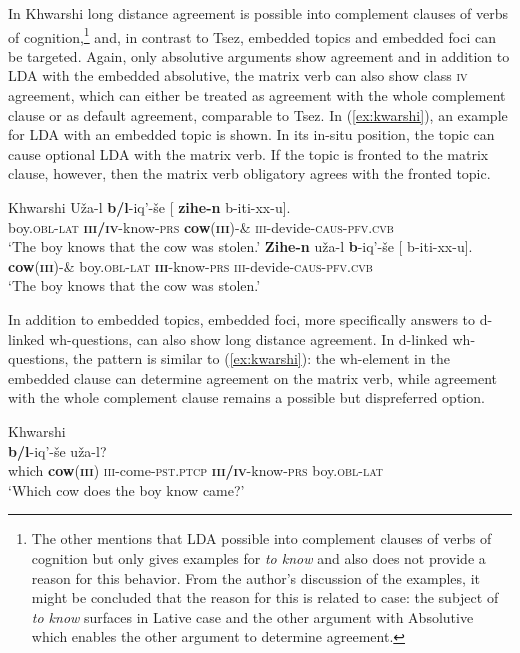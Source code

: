 \documentclass[output=paper
,modfonts
,nonflat]{langsci/langscibook}
\begin{document}
In Khwarshi \citep{Khalilova2008,Khalilova2009} long distance agreement is possible into complement clauses of verbs of cognition,\footnote{The other mentions that LDA possible into complement clauses of verbs of cognition but only gives examples for \textit{to know} and also does not provide a reason for this behavior. From the author's discussion of the examples, it might be concluded that the reason for this is related to case: the subject of \textit{to know} surfaces in Lative case and the other argument with Absolutive which enables the other argument to determine agreement.} and, in contrast to Tsez, embedded topics and embedded foci can be targeted. Again, only absolutive arguments show agreement and in addition to LDA with the embedded absolutive, the matrix verb can also show class \textsc{iv} agreement, which can either be treated as agreement with the whole complement clause or as default agreement, comparable to Tsez. In (\ref{ex:kwarshi}), an example for LDA with an embedded topic is shown. In its in-situ position, the topic can cause optional LDA with the matrix verb. If the topic is fronted to the matrix clause, however, then the matrix verb obligatory agrees with the fronted topic. %
\begin{exe}
\ex Khwarshi  \citep[][118]{Khalilova2008}\label{ex:kwarshi}
	\xlist
	\ex
		\gll U\v{z}a-l \textbf{b/l}-iq'-\v{s}e [ \textbf{zihe-n} b-iti-xx-u].\\
			 boy.\textsc{obl-lat}  \textbf{\textsc{iii/iv}}-know-\textsc{prs} {} \textbf{cow}(\textbf{\textsc{iii}})-\& \textsc{iii}-devide-\textsc{caus}-\textsc{pfv.cvb}\\
		\glt `The boy knows that the cow was stolen.'
	\ex
		\gll \textbf{Zihe-n} u\v{z}a-l \textbf{b}-iq'-\v{s}e [ b-iti-xx-u].\\
			 \textbf{cow}(\textbf{\textsc{iii}})-\& boy.\textsc{obl-lat} \textbf{\textsc{iii}}-know-\textsc{prs} {} \textsc{iii}-devide-\textsc{caus}-\textsc{pfv.cvb}\\
		\glt `The boy knows that the cow was stolen.'
	\endxlist
\end{exe}
In addition to embedded topics, embedded foci, more specifically answers to d-linked wh-questions, can also show long distance agreement. In d-linked wh-questions, the pattern is similar to (\ref{ex:kwarshi}): the wh-element in the embedded clause can determine agreement on the matrix verb, while agreement with the whole complement clause remains a possible but dispreferred option. 
\begin{exe}
\ex Khwarshi  \citep[][390]{Khalilova2008}\\
	 \textbf{b/l}-iq'-\v{s}e u\v{z}a-l?\\
		 {} which \textbf{cow}(\textbf{\textsc{iii}}) \textsc{iii}-come-\textsc{pst.ptcp} {} \textbf{\textsc{iii/iv}}-know-\textsc{prs} boy.\textsc{obl-lat}\\
	\glt `Which cow does the boy know came?'
\end{exe}
\end{document}
